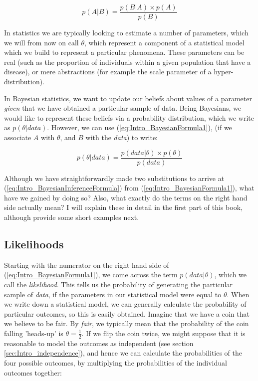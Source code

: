 \documentclass[11pt,fullpage]{book}
\begin{document}
\begin{equation}\label{eq:Intro_BayesianFormula1}
p(A|B) = \frac{p(B|A)\times p(A)}{p(B)}
\end{equation}

In statistics we are typically looking to estimate a number of parameters, which we will from now on call $\theta$, which represent a component of a statistical model which we build to represent a particular phenomena. These parameters can be real (such as the proportion of individuals within a given population that have a disease), or mere abstractions (for example the scale parameter of a hyper-distribution).

In Bayesian statistics, we want to update our beliefs about values of a parameter \textit{given} that we have obtained a particular sample of data. Being Bayesians, we would like to represent these beliefs via a probability distribution, which we write as $p(\theta|data)$. However, we can use (\ref{eq:Intro_BayesianFormula1}), (if we associate $A$ with $\theta$, and $B$ with the \textit{data}) to write:

\begin{equation}\label{eq:Intro_BayesianInferenceFormula}
p(\theta|data) = \frac{p(data|\theta)\times p(\theta)}{p(data)}
\end{equation}

Although we have straightforwardly made two substitutions to arrive at (\ref{eq:Intro_BayesianInferenceFormula}) from (\ref{eq:Intro_BayesianFormula1}), what have we gained by doing so? Also, what exactly do the terms on the right hand side actually mean? I will explain these in detail in the first part of this book, although provide some short examples next.

\subsection{Likelihoods}\label{sec:Intro_likelihoods}
Starting with the numerator on the right hand side of (\ref{eq:Intro_BayesianFormula1}), we come across the term $p(data|\theta)$, which we call the \textit{likelihood}. This tells us the probability of generating the particular sample of \textit{data}, if the parameters in our statistical model were equal to $\theta$. When we write down a statistical model, we can generally calculate the probability of particular outcomes, so this is easily obtained. Imagine that we have a coin that we believe to be fair. By \textit{fair}, we typically mean that the probability of the coin falling 'heads-up' is $\theta=\frac{1}{2}$. If we flip the coin twice, we might suppose that it is reasonable to model the outcomes as independent (see section \ref{sec:Intro_independence}), and hence we can calculate the probabilities of the four possible outcomes, by multiplying the probabilities of the individual outcomes together:
\end{document}
